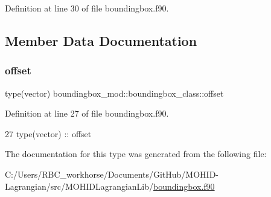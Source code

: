 Definition at line 30 of file boundingbox.\+f90.



\subsection{Member Data Documentation}
\mbox{\label{structboundingbox__mod_1_1boundingbox__class_a49a3cc9011829c2e1fbbbffa76580f63}} 
\subsubsection{\texorpdfstring{offset}{offset}}
{\footnotesize\ttfamily type(vector) boundingbox\+\_\+mod\+::boundingbox\+\_\+class\+::offset\hspace{0.3cm}{\ttfamily [private]}}



Definition at line 27 of file boundingbox.\+f90.


\begin{DoxyCode}
27         \textcolor{keywordtype}{type}(vector) :: offset
\end{DoxyCode}


The documentation for this type was generated from the following file\+:\begin{DoxyCompactItemize}
\item 
C\+:/\+Users/\+R\+B\+C\+\_\+workhorse/\+Documents/\+Git\+Hub/\+M\+O\+H\+I\+D-\/\+Lagrangian/src/\+M\+O\+H\+I\+D\+Lagrangian\+Lib/\mbox{\hyperlink{boundingbox_8f90}{boundingbox.\+f90}}\end{DoxyCompactItemize}
